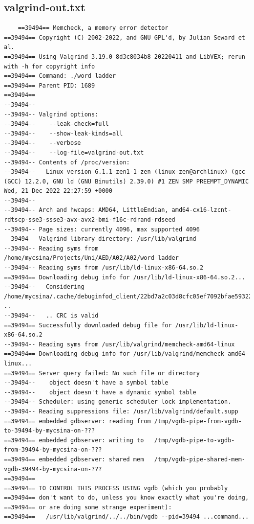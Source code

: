 \documentclass[a4paper,11pt]{article}
\begin{document}
	\subsection{valgrind-out.txt}
	
	\begin{lstlisting}
	==39494== Memcheck, a memory error detector
==39494== Copyright (C) 2002-2022, and GNU GPL'd, by Julian Seward et al.
==39494== Using Valgrind-3.19.0-8d3c8034b8-20220411 and LibVEX; rerun with -h for copyright info
==39494== Command: ./word_ladder
==39494== Parent PID: 1689
==39494== 
--39494-- 
--39494-- Valgrind options:
--39494--    --leak-check=full
--39494--    --show-leak-kinds=all
--39494--    --verbose
--39494--    --log-file=valgrind-out.txt
--39494-- Contents of /proc/version:
--39494--   Linux version 6.1.1-zen1-1-zen (linux-zen@archlinux) (gcc (GCC) 12.2.0, GNU ld (GNU Binutils) 2.39.0) #1 ZEN SMP PREEMPT_DYNAMIC Wed, 21 Dec 2022 22:27:59 +0000
--39494-- 
--39494-- Arch and hwcaps: AMD64, LittleEndian, amd64-cx16-lzcnt-rdtscp-sse3-ssse3-avx-avx2-bmi-f16c-rdrand-rdseed
--39494-- Page sizes: currently 4096, max supported 4096
--39494-- Valgrind library directory: /usr/lib/valgrind
--39494-- Reading syms from /home/mycsina/Projects/Uni/AED/A02/A02/word_ladder
--39494-- Reading syms from /usr/lib/ld-linux-x86-64.so.2
==39494== Downloading debug info for /usr/lib/ld-linux-x86-64.so.2...
--39494--   Considering /home/mycsina/.cache/debuginfod_client/22bd7a2c03d8cfc05ef7092bfae5932223189bc1/debuginfo ..
--39494--   .. CRC is valid
==39494== Successfully downloaded debug file for /usr/lib/ld-linux-x86-64.so.2
--39494-- Reading syms from /usr/lib/valgrind/memcheck-amd64-linux
==39494== Downloading debug info for /usr/lib/valgrind/memcheck-amd64-linux...
==39494== Server query failed: No such file or directory
--39494--    object doesn't have a symbol table
--39494--    object doesn't have a dynamic symbol table
--39494-- Scheduler: using generic scheduler lock implementation.
--39494-- Reading suppressions file: /usr/lib/valgrind/default.supp
==39494== embedded gdbserver: reading from /tmp/vgdb-pipe-from-vgdb-to-39494-by-mycsina-on-???
==39494== embedded gdbserver: writing to   /tmp/vgdb-pipe-to-vgdb-from-39494-by-mycsina-on-???
==39494== embedded gdbserver: shared mem   /tmp/vgdb-pipe-shared-mem-vgdb-39494-by-mycsina-on-???
==39494== 
==39494== TO CONTROL THIS PROCESS USING vgdb (which you probably
==39494== don't want to do, unless you know exactly what you're doing,
==39494== or are doing some strange experiment):
==39494==   /usr/lib/valgrind/../../bin/vgdb --pid=39494 ...command...

\end{lstlisting}
\end{document}
